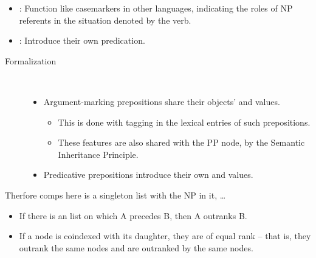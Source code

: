 \documentclass[a4paper,landscape,headrule,footrule]{foils}
\begin{document}
\begin{itemize}
\item {}: Function like casemarkers in other languages, indicating the
roles of NP referents in the situation denoted by the verb.
\item {}: Introduce their own predication.
\end{itemize}

\begin{description}
\item [Formalization] ~\\[-2ex]
  \begin{itemize}
  \item Argument-marking prepositions share their
    objects'  and  values.
    \begin{itemize}
    \item This is done with tagging in the lexical
      entries of such prepositions.
    \item These features are also shared with the PP
      node, by the Semantic Inheritance Principle.
    \end{itemize}
  \item Predicative prepositions introduce their own
 and  values.
\end{itemize}
\end{description}



Therfore comps here is a singleton list with the NP in it, \ldots

 \begin{itemize}
\item If there is an  list on which A
precedes B, then A outranks B.
\item If a node is coindexed with its daughter, they
are of equal rank -- that is, they outrank the
same nodes and are outranked by the same
nodes.
\end{itemize}
\end{document}
